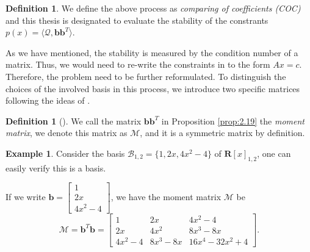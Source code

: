 \documentclass[12pt]{amsart}
\numberwithin{equation}{section}
\theoremstyle{definition}
\newtheorem{definition}[thm]{Definition}
\newtheorem{example}[thm]{Example}
\numberwithin{thm}{section}
\begin{document}
\begin{definition}
     We define the above process as \emph{comparing of coefficients (COC)} and this thesis is designated to evaluate the stability of the constrants $p(x) = \langle \mathcal{Q}, \mathbf{bb}^T \rangle$.
\end{definition}

As we have mentioned, the stability is measured by the condition number of a matrix. 
Thus, we would need to re-write the constraints in to the form $A x = c$. 
Therefore, the problem need to be further reformulated. 
To distinguish the choices of the involved basis in this process, we introduce two specific matrices following the ideas of \cite{Recher:Masterthesis}.

\begin{definition}[\cite{Recher:Masterthesis}]
     We call the matrix $\mathbf{bb}^T$ in Proposition \ref{prop:2.19} the \emph{moment matrix}, we denote this matrix as $\mathcal{M}$, and it is a symmetric matrix by definition.
\end{definition}

\begin{example}
     Consider the basis $\mathcal{B}_{1,2} = \{1, 2x, 4x^2 - 4\}$ of $\mathbf{R}[x]_{1, 2}$, one can easily verify this is a basis.

     If we write $\mathbf{b} = \begin{bmatrix}
          1 \\ 2x \\ 4x^2 - 4
     \end{bmatrix}$, we have the moment matrix $\mathcal{M}$ be \begin{equation*} 
          \mathcal{M} = \mathbf{b}^T\mathbf{b} = \begin{bmatrix}
          1 & 2x & 4x^2 - 4 \\
          2x & 4x^2 & 8x^3 - 8x \\
          4x^2 - 4 & 8x^3 - 8x & 16x^4 - 32x^2 + 4
          \end{bmatrix}. 
     \end{equation*}     

\end{example}
\end{document}
